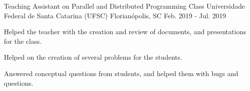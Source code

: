 

\begin{cventries}

  \cventry
    {Teaching Assistant on Parallel and Distributed Programming Class} %
    {Universidade Federal de Santa Catarina (UFSC)} %
    {Florianópolis, SC} %
    {Feb. 2019 - Jul. 2019} %
    {
      \begin{cvitems} %
        \item {Helped the teacher with the creation and review of documents, and
          presentations for the class.}
        \item {Helped on the creation of several problems for the students.}
        \item {Answered conceptual questions from students, and helped them with
          bugs and questions.}
      \end{cvitems}
    }

\end{cventries}
